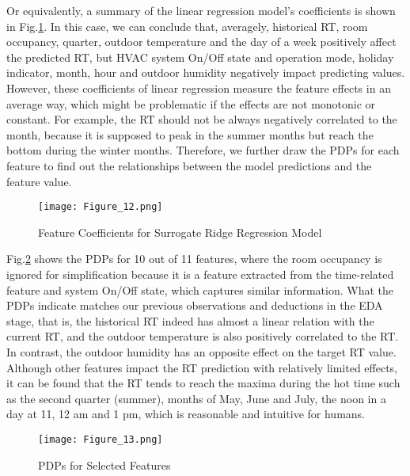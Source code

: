 \documentclass[11pt]{article}
\begin{document}
    Or equivalently, a summary of the linear regression model’s coefficients is shown in Fig.\ref{Linear_surrogate_feature_coef}. In this case, we can conclude that, averagely, historical RT, room occupancy, quarter, outdoor temperature and the day of a week positively affect the predicted RT, but HVAC system On/Off state and operation mode, holiday indicator, month, hour and outdoor humidity negatively impact predicting values. However, these coefficients of linear regression measure the feature effects in an average way, which might be problematic if the effects are not monotonic or constant. For example, the RT should not be always negatively correlated to the month, because it is supposed to peak in the summer months but reach the bottom during the winter months. Therefore, we further draw the PDPs for each feature to find out the relationships between the model predictions and the feature value.
    
    \begin{figure}[htbp]
    	\centering
    	\texttt{[image: Figure\_12.png]}
    	\caption{Feature Coefficients for Surrogate Ridge Regression Model}
    	\label{Linear_surrogate_feature_coef}
    \end{figure}       
    
    Fig.\ref{PDPs} shows the PDPs for 10 out of 11 features, where the room occupancy is ignored for simplification because it is a feature extracted from the time-related feature and system On/Off state, which captures similar information. What the PDPs indicate matches our previous observations and deductions in the EDA stage, that is, the historical RT indeed has almost a linear relation with the current RT, and the outdoor temperature is also positively correlated to the RT. In contrast, the outdoor humidity has an opposite effect on the target RT value. Although other features impact the RT prediction with relatively limited effects, it can be found that the RT tends to reach the maxima during the hot time such as the second quarter (summer), months of May, June and July, the noon in a day at 11, 12 am and 1 pm, which is reasonable and intuitive for humans.
    
    \begin{figure}[htbp]
    	\centering
    	\texttt{[image: Figure\_13.png]}
    	\caption{PDPs for Selected Features}
    	\label{PDPs}
    \end{figure}           
\end{document}

